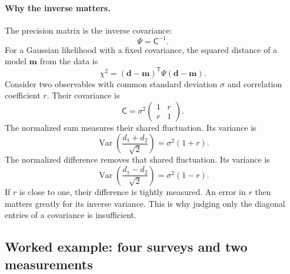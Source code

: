 \documentclass[11pt]{article}
\newcommand{\Cov}{\mathsf{C}}
\newcommand{\T}{^{\mathsf{T}}}
\newcommand{\Var}{\operatorname{Var}}
\begin{document}
\paragraph{Why the inverse matters.}
The precision matrix is the inverse covariance:
\begin{equation}
 \Psi=\Cov^{-1}.
\end{equation}
For a Gaussian likelihood with a fixed covariance, the squared distance of a model $\boldsymbol m$ from the
data is
\begin{equation}
 \chi^2=(\boldsymbol d-\boldsymbol m)\T\Psi
                  (\boldsymbol d-\boldsymbol m).
\end{equation}
Consider two observables with common standard deviation $\sigma$ and
correlation coefficient $r$. Their covariance is
\begin{equation}
 \Cov=\sigma^2\begin{pmatrix}1&r\\r&1\end{pmatrix}.
\end{equation}
The normalized sum measures their shared fluctuation. Its variance is
\begin{equation}
 \Var\left(\frac{d_1+d_2}{\sqrt2}\right)=\sigma^2(1+r).
\end{equation}
The normalized difference removes that shared fluctuation. Its variance is
\begin{equation}
 \Var\left(\frac{d_1-d_2}{\sqrt2}\right)=\sigma^2(1-r).
\end{equation} If $r$ is close to one, their difference is tightly measured.
An error in $r$ then matters greatly for its inverse variance. This is why
judging only the diagonal entries of a covariance is insufficient.


\subsection{Worked example: four surveys and two measurements}
\label{sec:four-surveys}
\end{document}

